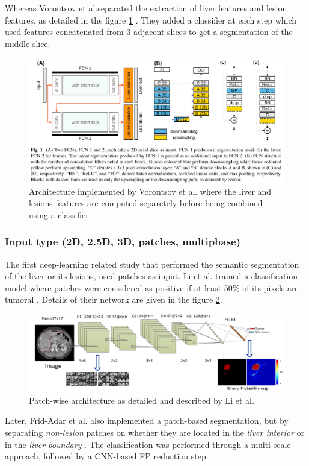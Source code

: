 \documentclass[]{article}
\begin{document}
	
	Whereas Vorontsov et al.separated the extraction of liver
	features and lesion features, as detailed in the figure \ref{Vorontsov2018_Fig1} \cite{Vorontsov2018}. They
	added a classifier at each step which used features concatenated from 3
	adjacent slices to get a segmentation of the middle slice.
	
	\begin{figure}[th!]
		\centering
		\includegraphics[width=0.7\linewidth]{images/image17}
		\caption{Architecture implemented by Vorontsov et al. where the liver and lesions features are computed separetely before being combined using a classifier \cite{Vorontsov2018}}
		\label{Vorontsov2018_Fig1}
	\end{figure}
	
	
	\subsubsection*{Input type (2D, 2.5D, 3D, patches, multiphase)}
	
	The first deep-learning related study that performed the semantic
	segmentation of the liver or its lesions, used patches as input.
	Li et al. trained a classification model where patches were
	considered as positive if at least 50\% of its pixels are tumoral \cite{Li2015}.
	Details of their network are given in the figure \ref{Li2015_Patch_fig}.
	
	\begin{figure}[th!]
		\centering
		\includegraphics[width=0.7\linewidth]{images/image2}
		\caption{Patch-wise architecture as detailed and described by Li et al. \cite{Li2015}}
		\label{Li2015_Patch_fig}
	\end{figure}
	
	
	Later, Frid-Adar et al. also implemented a patch-based
	segmentation, but by separating \emph{non-lesion} patches on whether
	they are located in the \emph{liver interior} or in the \emph{liver
		boundary} \cite{Frid-adar2017}. The classification was performed through a multi-scale
	approach, followed by a CNN-based FP reduction step.
	
\end{document}
